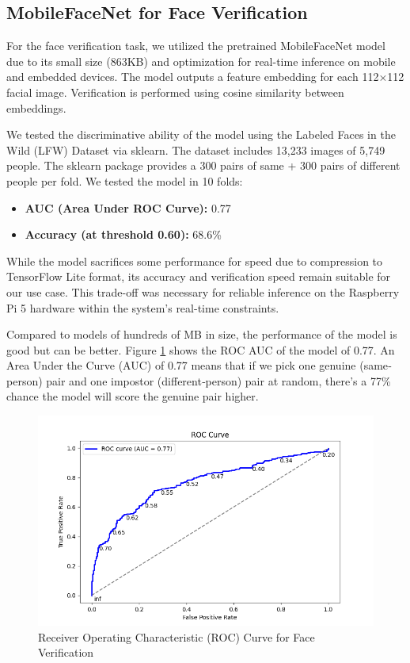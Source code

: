 \subsection{MobileFaceNet for Face Verification}

For the face verification task, we utilized the pretrained MobileFaceNet model due to its small size (863KB) and optimization for real-time inference on mobile and embedded devices. The model outputs a feature embedding for each 112$\times$112 facial image. Verification is performed using cosine similarity between embeddings.

We tested the discriminative ability of the model using the Labeled Faces in the Wild (LFW) Dataset via sklearn. The dataset includes 13,233 images of 5,749 people. The sklearn package provides a 300 pairs of same + 300 pairs of different people per fold. We tested the model in 10 folds:

\begin{itemize}
	\item \textbf{AUC (Area Under ROC Curve):} 0.77
	\item \textbf{Accuracy (at threshold 0.60):} 68.6\%
\end{itemize}

While the model sacrifices some performance for speed due to compression to TensorFlow Lite format, its accuracy and verification speed remain suitable for our use case. This trade-off was necessary for reliable inference on the Raspberry Pi 5 hardware within the system’s real-time constraints.

Compared to models of hundreds of MB in size, the performance of the model is good but can be better. Figure \ref{fig:roc_curve} shows the ROC AUC of the model of 0.77. An Area Under the Curve (AUC) of 0.77 means that if we pick one genuine (same‐person) pair and one impostor (different‐person) pair at random, there’s a 77\% chance the model will score the genuine pair higher.
\begin{figure}[h] %
	\centering
	\includegraphics[width=1\textwidth]{figures/chapter4/roc_curve.png} %
	\caption{Receiver Operating Characteristic (ROC) Curve for Face Verification}
	\label{fig:roc_curve}
\end{figure}

